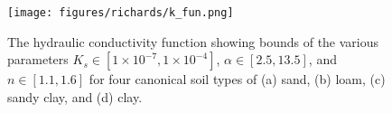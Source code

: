 \begin{figure}[!htbp]
\begin{center}
\texttt{[image: figures/richards/k\_fun.png]}
\end{center}
\caption{
    The hydraulic conductivity function showing bounds of the various parameters
    $K_s \in [1\times 10^{-7}, 1\times 10^{-4}]$, $\alpha \in [2.5, 13.5]$, and $n \in [1.1, 1.6]$
    for four canonical soil types of (a) sand, (b) loam, (c) sandy clay, and (d) clay.
}
\label{fig:richards-k_fun}
\end{figure}
